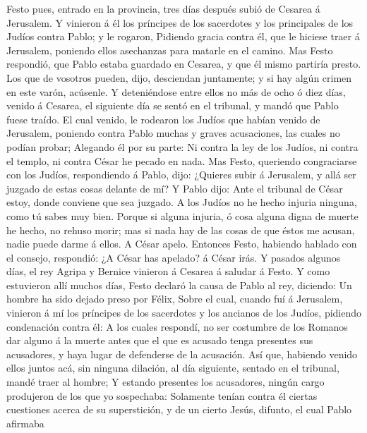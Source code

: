  Festo pues, entrado en la provincia, tres días después
subió de Cesarea á Jerusalem.  Y vinieron á él los
príncipes de los sacerdotes y los principales de los Judíos contra
Pablo; y le rogaron,  Pidiendo gracia contra él, que le
hiciese traer á Jerusalem, poniendo ellos asechanzas para matarle en el
camino.  Mas Festo respondió, que Pablo estaba guardado en
Cesarea, y que él mismo partiría presto.  Los que de
vosotros pueden, dijo, desciendan juntamente; y si hay algún crimen en
este varón, acúsenle.  Y deteniéndose entre ellos no más
de ocho ó diez días, venido á Cesarea, el siguiente día se sentó en el
tribunal, y mandó que Pablo fuese traído.  El cual venido,
le rodearon los Judíos que habían venido de Jerusalem, poniendo contra
Pablo muchas y graves acusaciones, las cuales no podían probar;
 Alegando él por su parte: Ni contra la ley de los Judíos,
ni contra el templo, ni contra César he pecado en nada. 
Mas Festo, queriendo congraciarse con los Judíos, respondiendo á Pablo,
dijo: ¿Quieres subir á Jerusalem, y allá ser juzgado de estas cosas
delante de mí?  Y Pablo dijo: Ante el tribunal de César
estoy, donde conviene que sea juzgado. A los Judíos no he hecho injuria
ninguna, como tú sabes muy bien.  Porque si alguna
injuria, ó cosa alguna digna de muerte he hecho, no rehuso morir; mas si
nada hay de las cosas de que éstos me acusan, nadie puede darme á ellos.
A César apelo.  Entonces Festo, habiendo hablado con el
consejo, respondió: ¿A César has apelado? á César irás. 
Y pasados algunos días, el rey Agripa y Bernice vinieron á Cesarea á
saludar á Festo.  Y como estuvieron allí muchos días,
Festo declaró la causa de Pablo al rey, diciendo: Un hombre ha sido
dejado preso por Félix,  Sobre el cual, cuando fuí á
Jerusalem, vinieron á mí los príncipes de los sacerdotes y los ancianos
de los Judíos, pidiendo condenación contra él:  A los
cuales respondí, no ser costumbre de los Romanos dar alguno á la muerte
antes que el que es acusado tenga presentes sus acusadores, y haya lugar
de defenderse de la acusación.  Así que, habiendo venido
ellos juntos acá, sin ninguna dilación, al día siguiente, sentado en el
tribunal, mandé traer al hombre;  Y estando presentes los
acusadores, ningún cargo produjeron de los que yo sospechaba:
 Solamente tenían contra él ciertas cuestiones acerca de
su superstición, y de un cierto Jesús, difunto, el cual Pablo afirmaba
